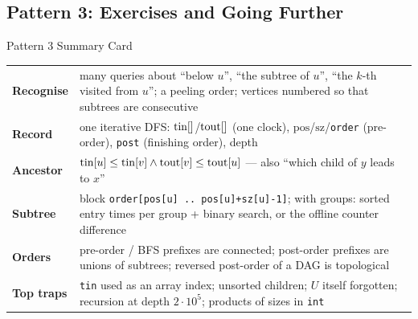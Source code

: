 \subsection{Pattern 3: Exercises and Going Further}
\label{ssec:ch2-p3-ex}

\begin{patternbox}{Pattern 3 Summary Card}
\renewcommand{\arraystretch}{1.25}
\begin{tabularx}{\linewidth}{@{}>{\bfseries}l X@{}}
Recognise & many queries about ``below $u$'', ``the subtree of $u$'', ``the $k$-th visited from $u$''; a peeling order; vertices numbered so that subtrees are consecutive \\
Record & one iterative DFS: $\mathrm{tin}[]$/$\mathrm{tout}[]$ (one clock), $\mathrm{pos}$/$\mathrm{sz}$/\texttt{order} (pre-order), \texttt{post} (finishing order), depth \\
Ancestor & $\mathrm{tin}[u] \le \mathrm{tin}[v] \wedge \mathrm{tout}[v] \le \mathrm{tout}[u]$ --- also ``which child of $y$ leads to $x$'' \\
Subtree & block \texttt{order[pos[u] .. pos[u]+sz[u]-1]}; with groups: sorted entry times per group + binary search, or the offline counter difference \\
Orders & pre-order / BFS prefixes are connected; post-order prefixes are unions of subtrees; reversed post-order of a DAG is topological \\
Top traps & \texttt{tin} used as an array index; unsorted children; $U$ itself forgotten; recursion at depth $2\cdot10^5$; products of sizes in \texttt{int} \\
\end{tabularx}
\end{patternbox}

